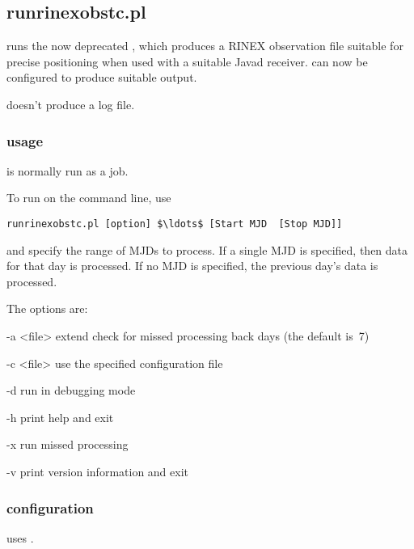 \subsection{runrinexobstc.pl}

\hypertarget{h:runrinexobstc}{}

 runs the now deprecated , which produces a
RINEX observation file suitable for precise positioning when used with a 
suitable Javad receiver.  can now be configured to produce suitable output.

 doesn't produce a log file.
	
\subsubsection{usage}
 is normally run as a  job.

To run  on the command line, use
\begin{lstlisting}[mathescape=true]
runrinexobstc.pl [option] $\ldots$ [Start MJD  [Stop MJD]]
\end{lstlisting}

 and  specify the range of MJDs to process.
If a single MJD is specified, then data for that day is processed. If no
MJD is specified, the previous day's data is processed.

The options are:
\begin{description*}
	\item[-a \textless{file}\textgreater]  extend check for missed processing back  days 
		(the default is~7)
	\item[-c \textless{file}\textgreater] use the specified configuration file
	\item[-d]	run in debugging mode
	\item[-h]	print help and exit
	\item[-x] run missed processing
	\item[-v]	print version information and exit
\end{description*}

\subsubsection{configuration}

 uses . 

